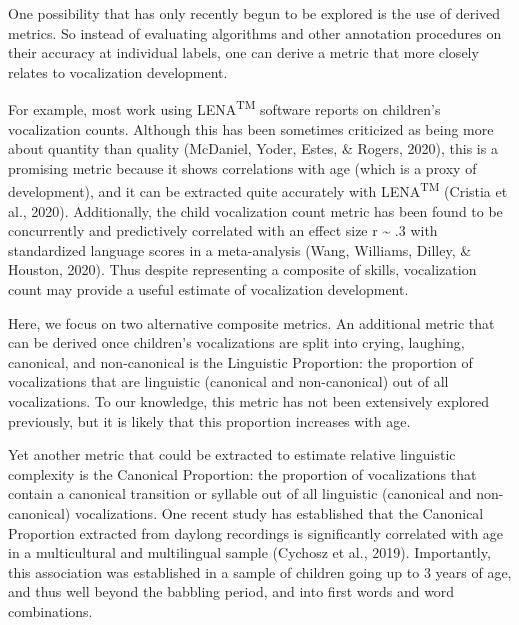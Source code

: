 \documentclass[english,,man,floatsintext]{apa6}
\begin{document}
One possibility that has only recently begun to be explored is the use of derived metrics. So instead of evaluating algorithms and other annotation procedures on their accuracy at individual labels, one can derive a metric that more closely relates to vocalization development.

For example, most work using LENA\textsuperscript{TM} software reports on children's vocalization counts. Although this has been sometimes criticized as being more about quantity than quality (McDaniel, Yoder, Estes, \& Rogers, 2020), this is a promising metric because it shows correlations with age (which is a proxy of development), and it can be extracted quite accurately with LENA\textsuperscript{TM} (Cristia et al., 2020). Additionally, the child vocalization count metric has been found to be concurrently and predictively correlated with an effect size r \textasciitilde{} .3 with standardized language scores in a meta-analysis (Wang, Williams, Dilley, \& Houston, 2020). Thus despite representing a composite of skills, vocalization count may provide a useful estimate of vocalization development.

Here, we focus on two alternative composite metrics. An additional metric that can be derived once children's vocalizations are split into crying, laughing, canonical, and non-canonical is the Linguistic Proportion: the proportion of vocalizations that are linguistic (canonical and non-canonical) out of all vocalizations. To our knowledge, this metric has not been extensively explored previously, but it is likely that this proportion increases with age.

Yet another metric that could be extracted to estimate relative linguistic complexity is the Canonical Proportion: the proportion of vocalizations that contain a canonical transition or syllable out of all linguistic (canonical and non-canonical) vocalizations. One recent study has established that the Canonical Proportion extracted from daylong recordings is significantly correlated with age in a multicultural and multilingual sample (Cychosz et al., 2019). Importantly, this association was established in a sample of children going up to 3 years of age, and thus well beyond the babbling period, and into first words and word combinations.
\end{document}
